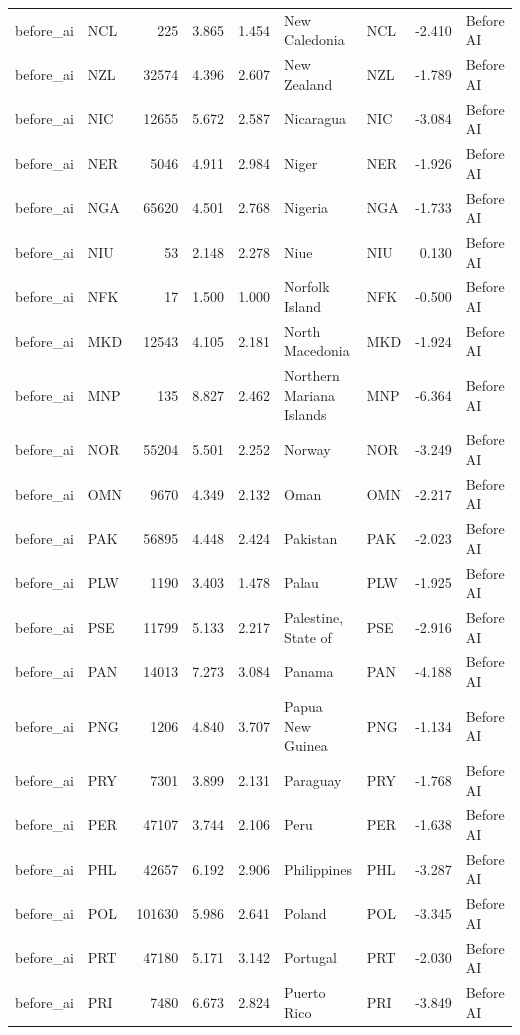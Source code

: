 \begin{tabular}{llrrrllrl}
before\_ai & NCL & 225 & 3.865 & 1.454 & New Caledonia & NCL & -2.410 & Before AI \\
before\_ai & NZL & 32574 & 4.396 & 2.607 & New Zealand & NZL & -1.789 & Before AI \\
before\_ai & NIC & 12655 & 5.672 & 2.587 & Nicaragua & NIC & -3.084 & Before AI \\
before\_ai & NER & 5046 & 4.911 & 2.984 & Niger & NER & -1.926 & Before AI \\
before\_ai & NGA & 65620 & 4.501 & 2.768 & Nigeria & NGA & -1.733 & Before AI \\
before\_ai & NIU & 53 & 2.148 & 2.278 & Niue & NIU & 0.130 & Before AI \\
before\_ai & NFK & 17 & 1.500 & 1.000 & Norfolk Island & NFK & -0.500 & Before AI \\
before\_ai & MKD & 12543 & 4.105 & 2.181 & North Macedonia & MKD & -1.924 & Before AI \\
before\_ai & MNP & 135 & 8.827 & 2.462 & Northern Mariana Islands & MNP & -6.364 & Before AI \\
before\_ai & NOR & 55204 & 5.501 & 2.252 & Norway & NOR & -3.249 & Before AI \\
before\_ai & OMN & 9670 & 4.349 & 2.132 & Oman & OMN & -2.217 & Before AI \\
before\_ai & PAK & 56895 & 4.448 & 2.424 & Pakistan & PAK & -2.023 & Before AI \\
before\_ai & PLW & 1190 & 3.403 & 1.478 & Palau & PLW & -1.925 & Before AI \\
before\_ai & PSE & 11799 & 5.133 & 2.217 & Palestine, State of & PSE & -2.916 & Before AI \\
before\_ai & PAN & 14013 & 7.273 & 3.084 & Panama & PAN & -4.188 & Before AI \\
before\_ai & PNG & 1206 & 4.840 & 3.707 & Papua New Guinea & PNG & -1.134 & Before AI \\
before\_ai & PRY & 7301 & 3.899 & 2.131 & Paraguay & PRY & -1.768 & Before AI \\
before\_ai & PER & 47107 & 3.744 & 2.106 & Peru & PER & -1.638 & Before AI \\
before\_ai & PHL & 42657 & 6.192 & 2.906 & Philippines & PHL & -3.287 & Before AI \\
before\_ai & POL & 101630 & 5.986 & 2.641 & Poland & POL & -3.345 & Before AI \\
before\_ai & PRT & 47180 & 5.171 & 3.142 & Portugal & PRT & -2.030 & Before AI \\
before\_ai & PRI & 7480 & 6.673 & 2.824 & Puerto Rico & PRI & -3.849 & Before AI \\

\end{tabular}

